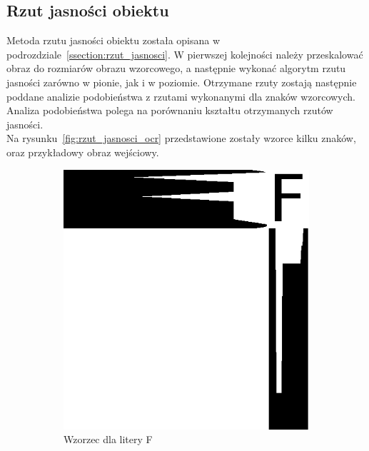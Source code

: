 \subsection{Rzut jasności obiektu}
Metoda rzutu jasności obiektu została opisana w podrozdziale~\ref{ssection:rzut_jasnosci}. W pierwszej kolejności należy przeskalować obraz do rozmiarów obrazu wzorcowego, a następnie wykonać algorytm rzutu jasności zarówno w pionie, jak i w poziomie. Otrzymane rzuty zostają następnie poddane analizie podobieństwa z rzutami wykonanymi dla znaków wzorcowych. Analiza podobieństwa polega na porównaniu kształtu otrzymanych rzutów jasności. \\
Na rysunku~\ref{fig:rzut_jasnosci_ocr} przedstawione zostały wzorce kilku znaków, oraz przykładowy obraz wejściowy.

\begin{figure}
  \centering
  \begin{subfigure}[b]{0.42\textwidth}
    \includegraphics[width=\textwidth]{img/rzut-wzorzec-F}
    \caption{Wzorzec dla litery F}
    \label{fig:rzut_wzorzec_F}
  \end{subfigure}
  ~
  \begin{subfigure}[b]{0.42\textwidth}

\end{subfigure}
\end{figure}
